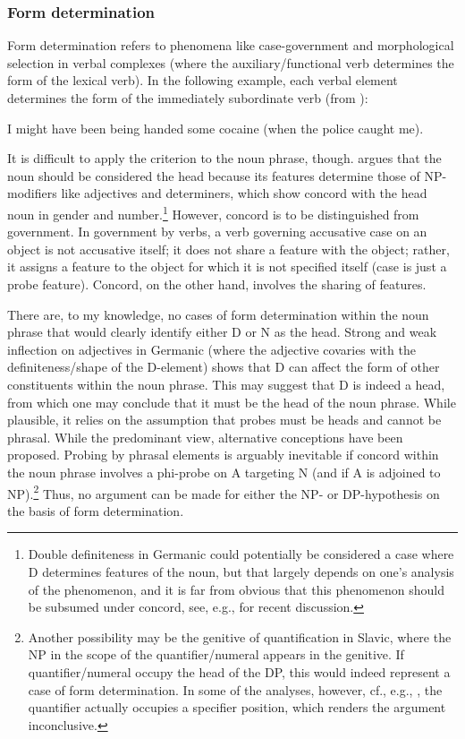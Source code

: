 \documentclass[output=paper,colorlinks,citecolor=black,
]{langscibook}
\begin{document}
\subsubsection{Form determination}

Form determination refers to phenomena like case-government and morphological selection in verbal complexes (where the auxiliary/functional verb determines the form of the lexical verb). In the following example, each verbal element determines the form of the immediately subordinate verb (from \citealt[30]{Bruening:2009:DP}):


\ea I might have been being handed some cocaine (when the police caught me).
\z

It is difficult to apply the criterion to the noun phrase, though. \citet{Bruening:2009:DP} argues that the noun should be considered the head because its features determine those of NP-modifiers like adjectives and determiners, which show concord with the head noun in gender and number.\footnote{Double definiteness in Germanic could potentially be considered a case where D determines features of the noun, but that largely depends on one's analysis of the phenomenon, and it is far from obvious that this phenomenon should be subsumed under concord, see, e.g., \citet{Schoorlemmer:2012:DefinitenessGermanic} for recent discussion.} However, concord is to be distinguished from government. In government by verbs, a verb governing accusative case on an object is not accusative itself; it does not share a feature with the object; rather, it assigns a feature to the object for which it is not specified itself (case is just a probe feature). Concord, on the other hand, involves the sharing of features. 

 There are, to my knowledge, no cases of form determination within the noun phrase that would clearly identify either D or N as the head. Strong and weak inflection on adjectives in Germanic (where the adjective covaries with the definiteness/shape of the D-element) shows that D can affect the form of other constituents within the noun phrase. This may suggest that D is indeed a head, from which one may conclude that it must be the head of the noun phrase. While plausible, it relies on the assumption that probes must be heads and cannot be phrasal. While the predominant view, alternative conceptions have been proposed. Probing by phrasal elements is arguably inevitable if concord within the noun phrase involves a phi-probe on A targeting N (and if A is adjoined to NP).\footnote{Another possibility may be the genitive of quantification in Slavic, where the NP in the scope of the quantifier/numeral appears in the genitive. If quantifier/numeral occupy the head of the DP, this would indeed represent a case of form determination. In some of the analyses, however, cf., e.g., \citet{Boskovic:2006:CaseAgreementGenQuant}, the quantifier actually occupies a specifier position, which renders the argument inconclusive.} 
 Thus, no argument can be made for either the NP- or DP-hypothesis on the basis of form determination.
\end{document}
